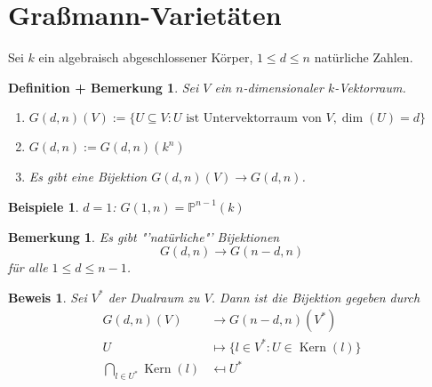 \documentclass[a4paper,12pt]{report}
\theoremstyle{break}
\newtheorem{DefBem}[Def]{Definition + Bemerkung}
\newtheorem{Bem}[Def]{Bemerkung}
\theoremstyle{nonumberbreak}
\newtheorem{nnBsp}{Beispiele}
\theoremstyle{nonumberplain}
\newtheorem{Bew}{Beweis}
\DeclareMathOperator{\Kern}{Kern}
\begin{document}
\section{Graßmann-Varietäten}
Sei $k$ ein algebraisch abgeschlossener Körper, $1\leq d \leq n$ natürliche Zahlen.
\begin{DefBem}
\label{defbem:12.1}
Sei $V$ ein $n$-dimensionaler $k$-Vektorraum.
\begin{enumerate}
\item $G(d,n)(V):=\{U\subseteq V: U \text{~ist~Untervektorraum~von~} V, \dim(U)=d\}$
\item $G(d,n):= G(d,n)(k^n)$
\item Es gibt eine Bijektion $G(d,n)(V)\rightarrow G(d,n)$.
\end{enumerate}
\end{DefBem}
\begin{nnBsp}
$d=1$: $G(1,n)= \mathbb{P}^{n-1}(k)$
\end{nnBsp}
\begin{Bem}
\label{bem: 12.2}
Es gibt "'natürliche"' Bijektionen 
$$G(d,n) \rightarrow G(n-d,n)$$
für alle $1\leq d\leq n-1$.
\end{Bem}
\begin{Bew}
Sei $V^*$ der Dualraum zu $V$. Dann ist die Bijektion gegeben durch 
\begin{align*}
G(d,n)(V)&\rightarrow G(n-d,n)(V^*)\\
U&\mapsto \{l\in V^*:U\in\Kern(l)\}\\
\bigcap_{l\in U^*}\Kern(l)&\mapsfrom U^*
\end{align*}
\end{Bew}
\end{document}
